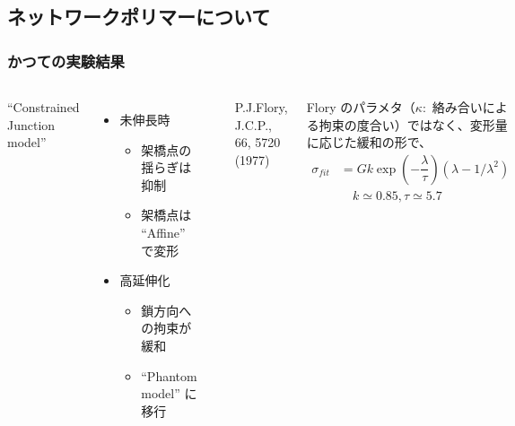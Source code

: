 \documentclass[11pt, dvipdfmx]{beamer}
\begin{document}
\subsection{ネットワークポリマーについて}
\begin{frame}
    \frametitle{かつての実験結果}
    
    \begin{columns}[totalwidth=1\textwidth]
    
    ``Constrained Junction model''
    
    \begin{itemize}
    \item
    未伸長時
        \begin{itemize}
        \item
        架橋点の揺らぎは抑制
        \item
        架橋点は ``Affine'' で変形
        \end{itemize}
    \item
    高延伸化
        \begin{itemize}
        \item
        鎖方向への拘束が緩和
        \item
        ``Phantom model'' に移行
        \end{itemize}
    \end{itemize}
    
    \includegraphics[width=\columnwidth]{./fig/Constrained_Juntion.pdf}
    
    \footnotesize
    P.J.Flory, J.C.P., 66, 5720 (1977)  
    
    Flory のパラメタ（$\kappa:$ 絡み合いによる拘束の度合い）ではなく、変形量に応じた緩和の形で、
    \scriptsize
    \begin{align*}
    \sigma_{fit}&=Gk\exp\left( -\dfrac{\lambda}{\tau} \right) (\lambda-1/\lambda^2)\\
    &\quad k\simeq0.85, \tau \simeq 5.7
    \end{align*}
    

\end{columns}
\end{frame}
\end{document}
